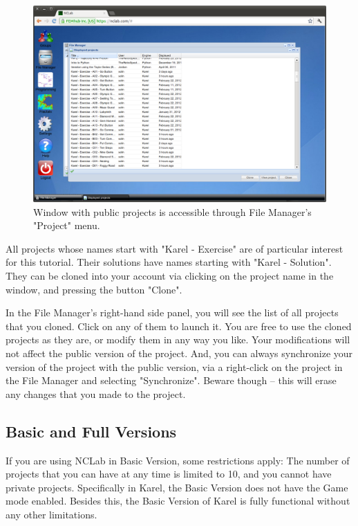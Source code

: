 \documentclass[article,A4,12pt]{llncs}
\begin{document}
\begin{figure}[!ht]
\begin{center}
\includegraphics[width=\textwidth]{img/cloning.png}
\end{center}
\caption{Window with public projects is accessible through File Manager's "Project" menu.}
\label{fig:cloning}
\end{figure}
\noindent
All projects whose names start with "Karel - Exercise" are of particular interest 
for this tutorial. Their solutions have names starting with "Karel - Solution". 
They can be cloned into your account via clicking on the project name in the window, 
and pressing the button "Clone".

In the File Manager's right-hand side panel, you will see the list of all 
projects that you cloned. Click on any of them to launch it. You are free to 
use the cloned projects as they are, or modify them in any way you like. Your modifications 
will not affect the public version of the project. And, you can 
always synchronize your version of the project with the public version, via 
a right-click on the project in the File Manager and selecting "Synchronize".
Beware though -- this will erase any changes that you made to the project.

\subsection{Basic and Full Versions}

If you are using NCLab in Basic Version, some restrictions apply: The 
number of projects that you can have at any time is limited to 10, and you cannot have
private projects. Specifically in Karel, the Basic Version does not have the Game mode 
enabled. Besides this, the Basic Version of Karel is fully functional without any other 
limitations. 
\end{document}
